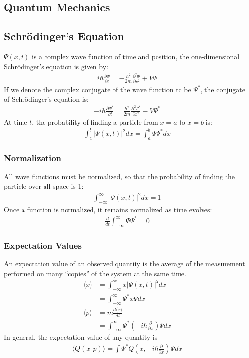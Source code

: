 \documentclass[11pt]{article}
\newcommand{\cc}[1]{
  \ensuremath{#1^{\ast}}}               %
\newcommand{\pd}[2]{
  \ensuremath{
    \frac{\partial #1}{\partial #2} }} %
\begin{document}
\begin{multicols*}{3}
\section{Quantum Mechanics}
\subsection{Schr\"{o}dinger's Equation}
$\Psi(x, t)$ is a complex wave function of time and position, the one-dimensional Schr\"{o}dinger's equation is given by:
\begin{align*}
i \hbar \pd{\Psi}{t} = - \frac{\hbar^2}{2m} \pd{^2 \Psi}{x^2} + V\Psi
\end{align*}
If we denote the complex conjugate of the wave function to be $\cc{\Psi}$, the conjugate of Schr\"{o}dinger's equation is:
\begin{align*}
-i \hbar \pd{\cc{\Psi}}{t} = \frac{\hbar^2}{2m} \pd{^2 \cc{\Psi}}{x^2} - V\cc{\Psi}
\end{align*}
At time $t$, the probability of finding a particle from $x=a$ to $x=b$ is:
\begin{align*}
\int_{a}^{b} |\Psi(x, t)|^2 dx = \int_{a}^{b}\Psi\cc{\Psi}dx
\end{align*}
\subsubsection{Normalization}
All wave functions must be normalized, so that the probability of finding the particle over all space is 1:
\begin{align*}
\int_{-\infty}^{\infty} |\Psi(x,t)|^2 dx = 1
\end{align*}
Once a function is normalized, it remains normalized as time evolves:
\begin{align*}
\frac{d}{dt} \int_{-\infty}^{\infty} \Psi \cc{\Psi} = 0
\end{align*}
\subsubsection{Expectation Values}
An expectation value of an observed quantity is the average of the measurement performed on many ``copies'' of the system at the same time.
\begin{align*}
\langle x\rangle &= \int_{-\infty}^{\infty} x |\Psi(x,t)|^2 dx \\
&= \int_{-\infty}^{\infty} \cc{\Psi} x \Psi dx \\
\langle p\rangle &= m\frac{d\langle x\rangle}{dt} \\
&= \int_{-\infty}^{\infty} \cc{\Psi} \left( -i\hbar \pd{}{x} \right) \Psi dx
\end{align*}
In general, the expectation value of any quantity is:
\begin{align*}
\langle Q(x, p) \rangle = \int \cc{\Psi} Q\left(x, -i\hbar\pd{}{x} \right) \Psi dx
\end{align*}


\end{multicols*}
\end{document}
